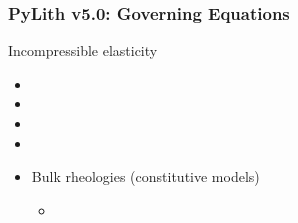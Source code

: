 \documentclass[aspectratio=169]{beamer}
\begin{document}
\begin{frame}
  \frametitle{PyLith v5.0: Governing Equations}
  \summary{}

  Incompressible elasticity
  \begin{itemize}
  \item {}
  \item {}
  \item {}
  \item {}
  \item Bulk rheologies (constitutive models)
    \begin{itemize}
    \item {}
    \end{itemize}
  \end{itemize}

  \vfill\hfill%
  \begin{minipage}{0.25\textwidth}
    \\
    \\
  \end{minipage}  

\end{frame}
\end{document}
